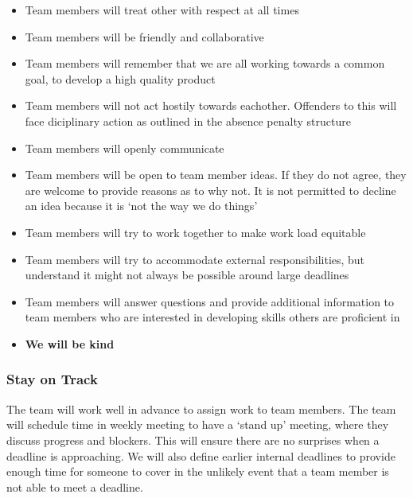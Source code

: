 \documentclass{article}
\begin{document}
\begin{itemize}
\item Team members will treat other with respect at all times
\item Team members will be friendly and collaborative
\item Team members will remember that we are all working towards a common goal, to develop a high quality product
\item Team members will not act hostily towards eachother. Offenders to this will face diciplinary action as outlined in the absence penalty structure
\item Team members will openly communicate
\item Team members will be open to team member ideas. If they do not agree, they are welcome to provide reasons as to why not. It is not permitted to decline an idea because it is `not the way we do things'
\item Team members will try to work together to make work load equitable
\item Team members will try to accommodate external responsibilities, but understand it might not always be possible around large deadlines
\item Team members will answer questions and provide additional information to team members who are interested in developing skills others are proficient in
\item \textbf{We will be kind}
\end{itemize}

\subsubsection*{Stay on Track}

The team will work well in advance to assign work to team members. The team will schedule time in weekly meeting to have a `stand up' meeting, where they
discuss progress and blockers. This will ensure there are no surprises when a deadline is approaching. We will also define earlier internal deadlines to provide enough
time for someone to cover in the unlikely event that a team member is not able to meet a deadline.\\
\end{document}
